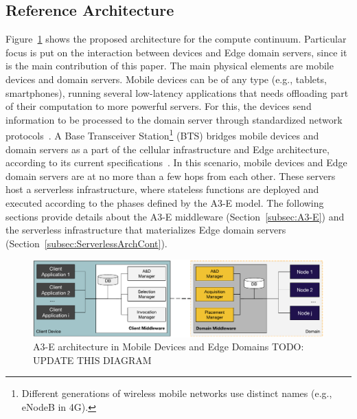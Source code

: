 \subsection{Reference Architecture}

Figure~\ref{fig:reference-architecture} shows the proposed architecture for the compute continuum. Particular focus is put on the interaction between devices and Edge domain servers, since it is the main contribution of this paper. 
The main physical elements are mobile devices and domain servers. Mobile devices can be of any type (e.g., tablets, smartphones), running several low-latency applications that needs offloading part of their computation to more powerful servers. For this, the devices send information to be processed to the domain server through standardized network protocols~\cite{Sill17standards}.  A Base Transceiver Station\footnote{Different generations of wireless mobile networks use distinct names (e.g., eNodeB in 4G).} (BTS) bridges mobile devices and domain servers as a part of the cellular infrastructure and  Edge architecture, according to its current specifications~\cite{hu2015mobile}. In this scenario, mobile devices and Edge domain servers are at no more than a few hops from each other. These servers host a serverless infrastructure, where stateless functions are deployed and executed according to the phases defined by the A3-E model. 
The following sections provide details about the A3-E middleware (Section~\ref{subsec:A3-E}) and the serverless infrastructure that materializes Edge domain servers (Section~\ref{subsec:ServerlessArchCont}).

\begin{figure}[tbp]
	\includegraphics[width=.95\textwidth]{figs/A3-E-reference-architecture}
	\caption{A3-E architecture in Mobile Devices and Edge Domains TODO: UPDATE THIS DIAGRAM}
	\label{fig:reference-architecture}
	\end{figure}